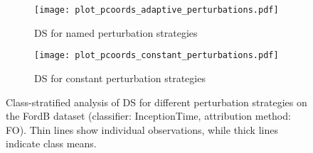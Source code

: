 \begin{figure}[!htbp]
    \centering
    \begin{subfigure}[b]{\textwidth}
        \centering
        \texttt{[image: plot\_pcoords\_adaptive\_perturbations.pdf]}
        \caption{DS for named perturbation strategies}
        \label{fig:perturbations_by_class_a}
    \end{subfigure}
    \vspace{0.8em}
    \begin{subfigure}[b]{\textwidth}
        \centering
        \texttt{[image: plot\_pcoords\_constant\_perturbations.pdf]}
        \caption{DS for constant perturbation strategies}
        \label{fig:perturbations_by_class_b}
    \end{subfigure}
    \caption{Class-stratified analysis of DS for different perturbation strategies on the FordB dataset (classifier: InceptionTime, attribution method: FO). Thin lines show individual observations, while thick lines indicate class means.}
    \label{fig:perturbations_by_class}
\end{figure}